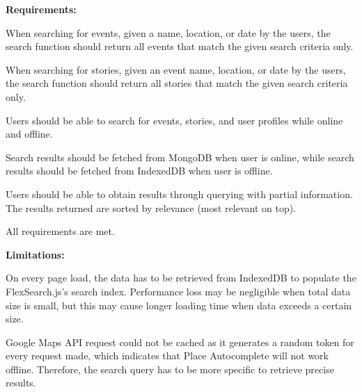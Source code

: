 \documentclass[11pt, a4paper]{article}
\begin{document}
%
\textbf{Requirements:}
\begin{enumerate*}[label=\textbf{\arabic*})]
\item When searching for events, given a name, location, or date by the users, the search function
should return all events that match the given search criteria only.
\item When searching for stories, given an event name, location, or date by the users, the search
function should return all stories that match the given search criteria only.
\item Users should be able to search for events, stories, and user profiles while online and
offline.
\item Search results should be fetched from MongoDB when user is online, while search results should
be fetched from IndexedDB when user is offline.
\item Users should be able to obtain results through querying with partial information. The results
returned are sorted by relevance (most relevant on top).
\item All requirements are met.
\end{enumerate*}
%
\textbf{Limitations:}
\begin{enumerate*}[label=\textbf{\arabic*})]
\item On every page load, the data has to be retrieved from IndexedDB to populate the
FlexSearch.js's search index. Performance loss may be negligible when total data size is small, but
this may cause longer loading time when data exceeds a certain size.
\item Google Maps API request could not be cached as it generates a random token for every request
made, which indicates that Place Autocomplete will not work offline. Therefore, the search query has
to be more specific to retrieve precise results.
\end{enumerate*}
\end{document}
